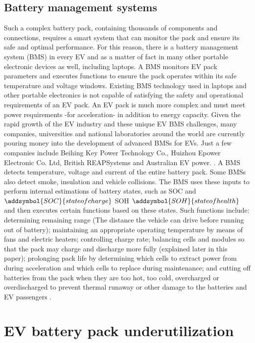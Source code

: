 	\section{Battery management systems}
Such a complex battery pack, containing thousands of components and connections, requires a smart system that can monitor the pack and ensure its safe and optimal performance. For this reason, there is a battery management system (BMS) in every EV and as a matter of fact in many other portable electronic devices as well, including laptops. A BMS monitors EV pack parameters and executes functions to ensure the pack operates within its safe temperature and voltage windows. Existing BMS technology used in laptops and other portable electronics is not capable of satisfying the safety and operational requirements of an EV pack. An EV pack is much more complex and must meet power requirements -for acceleration- in addition to energy capacity. Given the rapid growth of the EV industry and these unique EV BMS challenges,  many companies, universities and national laboratories around the world are currently pouring money into the development of advanced BMSs for EVs. Just a few companies include Beihing Key Power Technology Co., Huizhou Epower Electronic Co. Ltd, British REAPSystems and Australian EV power. \cite[p.~275]{LanguangLuXuebingHanJianqiuLiJianfengHua2013}. A BMS detects temperature, voltage and current of the entire battery pack. Some BMSs also detect smoke, insulation %
and vehicle collisions. The BMS uses these inputs to perform internal estimations of battery states, such as SOC and $\addsymbol{SOC}{state of charge}$ SOH $\addsymbol{SOH}{state of health}$  and then executes certain functions based on these states. Such functions include: determining remaining range (The distance the vehicle can drive before running out of battery); maintaining an appropriate operating temperature by means of fans and electric heaters; controlling charge rate; balancing cells and modules so that the pack may charge and discharge more fully (explained later in this paper); prolonging pack life by determining which cells to extract power from during acceleration and which cells to replace during maintenance;
and cutting off batteries from the pack when they are too hot, too cold, overcharged or overdischarged to prevent thermal runaway or other damage to the batteries and EV passengers \cite[p.~274]{LanguangLuXuebingHanJianqiuLiJianfengHua2013}.

\chapter{EV battery pack underutilization}
